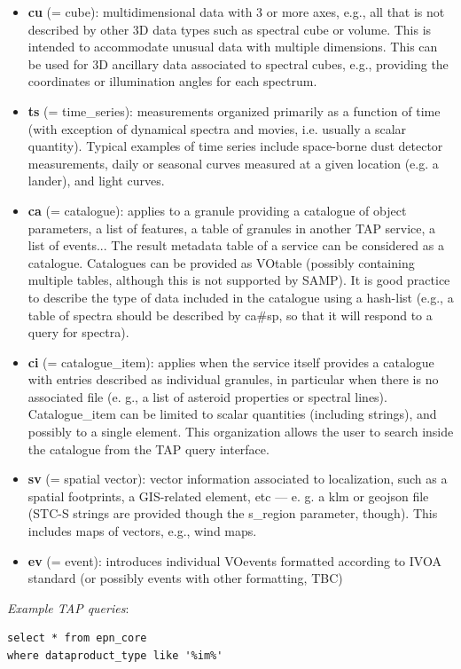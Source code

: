 \documentclass[11pt,a4paper]{ivoa}
\begin{document}
\begin{itemize}
\item \textbf{cu }(= cube): multidimensional data with 3 or more axes, e.g., all that is not described by other 3D data types such as spectral cube or volume. This is intended to accommodate unusual data with multiple dimensions. This can be used for 3D ancillary data associated to spectral cubes, e.g., providing the coordinates or illumination angles for each spectrum.
\item \textbf{ts }(= time\_series): measurements organized primarily as a function of time (with exception of dynamical spectra and movies, i.e. usually a scalar quantity). Typical examples of time series include space-borne dust detector measurements, daily or seasonal curves measured at a given location (e.g. a lander), and light curves.
\item \textbf{ca }(= catalogue): applies to a granule providing a catalogue of object parameters, a list of features, a table of granules in another TAP service, a list of events... The result metadata table of a service can be considered as a catalogue. Catalogues can be provided as VOtable (possibly containing multiple tables, although this is not supported by SAMP). It is good practice to describe the type of data included in the catalogue using a hash-list (e.g., a table of spectra should be described by ca\#sp, so that it will respond to a query for spectra).
\item \textbf{ci }(= catalogue\_item): applies when the service itself provides a catalogue with entries described as individual granules, in particular when there is no associated file (e. g., a list of asteroid properties or spectral lines). Catalogue\_item can be limited to scalar quantities (including strings), and possibly to a single element. This organization allows the user to search inside the catalogue from the TAP query interface.
\item \textbf{sv} (= spatial vector): vector information associated to localization, such as a spatial footprints, a GIS-related element, etc —  e. g. a klm or geojson file (STC-S strings are provided though the s\_region parameter, though). This includes maps of vectors, e.g., wind maps.
\item \textbf{ev} (= event): introduces individual VOevents formatted according to IVOA standard (or possibly events with other formatting, TBC)
\end{itemize}


\emph{Example TAP queries}:

\begin{verbatim}
select * from epn_core 
where dataproduct_type like '%im%'
\end{verbatim}
\end{document}

